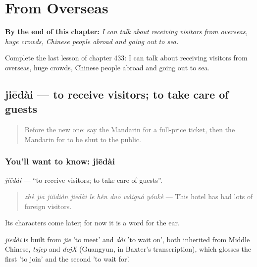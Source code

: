 
\chapter{From Overseas}
\label{ch:zh-from-overseas}

\begin{chapteropening}
\textbf{By the end of this chapter:} \emph{I can talk about receiving visitors from overseas, huge crowds, Chinese people abroad and going out to sea.}

Complete the last lesson of chapter 433: I can talk about receiving visitors from overseas, huge crowds, Chinese people abroad and going out to sea.
\end{chapteropening}

\section[jiēdài]{jiēdài — to receive visitors; to take care of guests}

\label{lesson:ZH-C433-jiedai}



\begin{quote}
Before the new one: say the Mandarin for a full-price ticket, then the Mandarin for to be shut to the public.
\end{quote}

\subsection*{You'll want to know: jiēdài}
\emph{jiēdài} — \textquotedblleft{}to receive visitors; to take care of guests\textquotedblright{}.

\begin{quote}
\emph{zhè jiā jiǔdiàn jiēdài le hěn duō wàiguó yóukè} — This hotel has had lots of foreign visitors.
\end{quote}

Its characters come later; for now it is a word for the ear.

\begin{cousinweb}
\emph{jiēdài} is built from \emph{jiē} 'to meet' and \emph{dài} 'to wait on', both inherited from Middle Chinese, \emph{tsjep} and \emph{dojX} (Guangyun, in Baxter's transcription), which glosses the first 'to join' and the second 'to wait for'.
\end{cousinweb}

